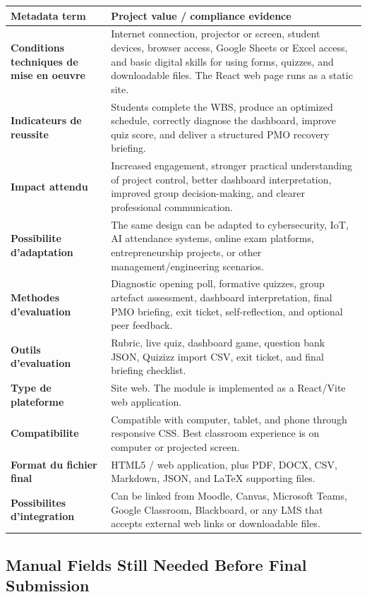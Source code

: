 \documentclass[11pt,a4paper]{article}
\begin{document}
\begin{longtable}{>{\bfseries}p{4.6cm}p{9.9cm}}
\textbf{Metadata term} & \textbf{Project value / compliance evidence} \\
\hline
Conditions techniques de mise en oeuvre & Internet connection, projector or screen, student devices, browser access, Google Sheets or Excel access, and basic digital skills for using forms, quizzes, and downloadable files. The React web page runs as a static site. \\
Indicateurs de reussite & Students complete the WBS, produce an optimized schedule, correctly diagnose the dashboard, improve quiz score, and deliver a structured PMO recovery briefing. \\
Impact attendu & Increased engagement, stronger practical understanding of project control, better dashboard interpretation, improved group decision-making, and clearer professional communication. \\
Possibilite d'adaptation & The same design can be adapted to cybersecurity, IoT, AI attendance systems, online exam platforms, entrepreneurship projects, or other management/engineering scenarios. \\
Methodes d'evaluation & Diagnostic opening poll, formative quizzes, group artefact assessment, dashboard interpretation, final PMO briefing, exit ticket, self-reflection, and optional peer feedback. \\
Outils d'evaluation & Rubric, live quiz, dashboard game, question bank JSON, Quizizz import CSV, exit ticket, and final briefing checklist. \\
Type de plateforme & Site web. The module is implemented as a React/Vite web application. \\
Compatibilite & Compatible with computer, tablet, and phone through responsive CSS. Best classroom experience is on computer or projected screen. \\
Format du fichier final & HTML5 / web application, plus PDF, DOCX, CSV, Markdown, JSON, and LaTeX supporting files. \\
Possibilites d'integration & Can be linked from Moodle, Canvas, Microsoft Teams, Google Classroom, Blackboard, or any LMS that accepts external web links or downloadable files. \\
\end{longtable}

\subsection*{Manual Fields Still Needed Before Final Submission}
\end{document}
